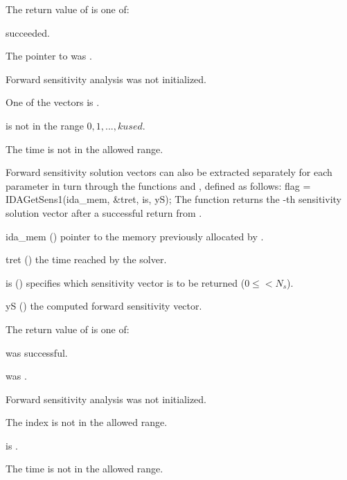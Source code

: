{
  The return value  of  is one of:
  \begin{args}
  \item[\Id{IDA\_SUCCESS}] 
     succeeded.
  \item[\Id{IDA\_MEM\_NULL}] 
    The pointer to  was .
  \item[\Id{IDA\_NO\_SENS}] 
    Forward sensitivity analysis was not initialized.
  \item[\Id{IDA\_BAD\_DKY}] 
    One of the vectors  is .
  \item[\Id{IDA\_BAD\_K}]
     is not in the range $0, 1, ..., kused$.
  \item[\Id{IDA\_BAD\_T}] 
    The time  is not in the allowed range.
  \end{args}
}
{}
Forward sensitivity solution vectors can also be extracted separately for 
each parameter in turn through the functions  and
, defined as follows:
{
  flag = IDAGetSens1(ida\_mem, \&tret, is, yS);
}
{
  The function  returns the -th sensitivity solution vector
  after a successful return from .
}
{
  \begin{args}
  \item[ida\_mem] ()
    pointer to the memory previously allocated by .
  \item[tret] ()
    the time reached by the solver.
  \item[is] () specifies which sensitivity vector is to be returned
    ($0\le$$< N_s$).
  \item[yS] ()
    the computed forward sensitivity vector.
  \end{args}
}
{
  The return value  of  is one of:
  \begin{args}
  \item[\Id{IDA\_SUCCESS}]
     was successful.
  \item[\Id{IDA\_MEM\_NULL}] 
     was .
  \item[\Id{IDA\_NO\_SENS}] 
    Forward sensitivity analysis was not initialized.
  \item[\Id{IDA\_BAD\_IS}]
    The index  is not in the allowed range.
  \item[\Id{IDA\_BAD\_DKY}] 
     is .
  \item[\Id{IDA\_BAD\_T}] 
    The time  is not in the allowed range.
  \end{args}
}
